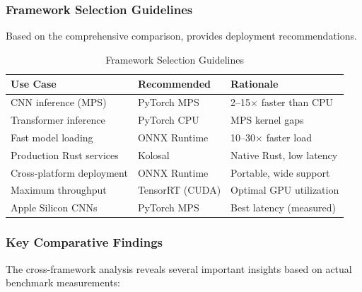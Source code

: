 \documentclass[10pt,twocolumn,a4paper]{article}
\theoremstyle{definition}
\theoremstyle{plain}
\begin{document}
\subsubsection{Framework Selection Guidelines}

Based on the comprehensive comparison,  provides deployment recommendations.

\begin{table}[t]
\centering
\caption{Framework Selection Guidelines}
\label{tab:framework_selection}
\scriptsize
\setlength{\tabcolsep}{3pt}
\begin{tabular}{@{}lll@{}}
\toprule
\textbf{Use Case} & \textbf{Recommended} & \textbf{Rationale} \\
\midrule
CNN inference (MPS) & PyTorch MPS & 2--15$\times$ faster than CPU \\
Transformer inference & PyTorch CPU & MPS kernel gaps \\
Fast model loading & ONNX Runtime & 10--30$\times$ faster load \\
Production Rust services & Kolosal & Native Rust, low latency \\
Cross-platform deployment & ONNX Runtime & Portable, wide support \\
Maximum throughput & TensorRT (CUDA) & Optimal GPU utilization \\
Apple Silicon CNNs & PyTorch MPS & Best latency (measured) \\
\bottomrule
\end{tabular}
\end{table}

\subsubsection{Key Comparative Findings}

The cross-framework analysis reveals several important insights based on actual benchmark measurements:
\end{document}
